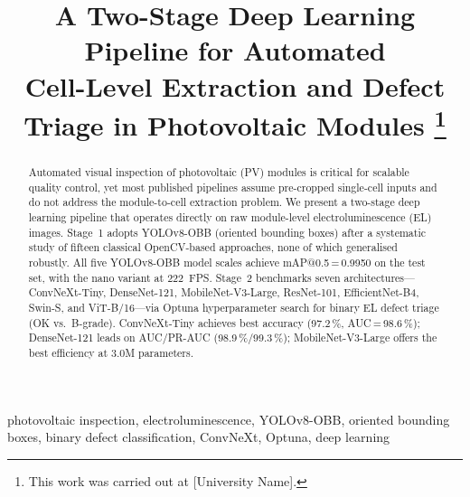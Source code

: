 \documentclass[conference]{IEEEtran}
\begin{document}
\title{A Two-Stage Deep Learning Pipeline for Automated\\
Cell-Level Extraction and Defect Triage in Photovoltaic Modules%
\thanks{This work was carried out at [University Name].}}

\author{%
\and
{}
}

\maketitle

\begin{abstract}
Automated visual inspection of photovoltaic (PV) modules is critical for scalable quality control, yet most published pipelines assume pre-cropped single-cell inputs and do not address the module-to-cell extraction problem. We present a two-stage deep learning pipeline that operates directly on raw module-level electroluminescence (EL) images. Stage~1 adopts YOLOv8-OBB (oriented bounding boxes) after a systematic study of fifteen classical OpenCV-based approaches, none of which generalised robustly. All five YOLOv8-OBB model scales achieve mAP@0.5\,=\,0.9950 on the test set, with the nano variant at 222~FPS. Stage~2 benchmarks seven architectures---ConvNeXt-Tiny, DenseNet-121, MobileNet-V3-Large, ResNet-101, EfficientNet-B4, Swin-S, and ViT-B/16---via Optuna hyperparameter search for binary EL defect triage (OK vs.\ B-grade). ConvNeXt-Tiny achieves best accuracy (97.2\,\%, AUC\,=\,98.6\,\%); DenseNet-121 leads on AUC/PR-AUC (98.9\,\%/99.3\,\%); MobileNet-V3-Large offers the best efficiency at 3.0M parameters.
\end{abstract}

\begin{IEEEkeywords}
photovoltaic inspection, electroluminescence, YOLOv8-OBB, oriented bounding boxes, binary defect classification, ConvNeXt, Optuna, deep learning
\end{IEEEkeywords}
\end{document}
